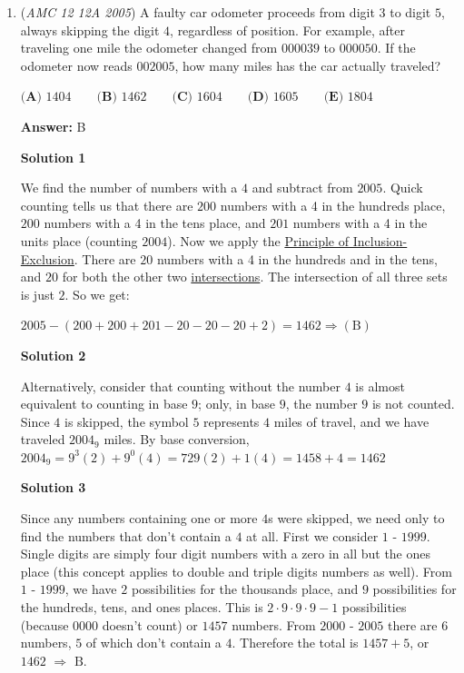 \begin{enumerate}
 $|S_2 \cup S_3 \cup S_5| = |S_2| + |S_3| + |S_5| - |S_2 \cap S_3| - |S_3 \cap S_5| - |S_2 \cap S_5| + |S_2 \cap S_3 \cap S_5|$
$= 500 + 333 + 200 - 166 - 66 - 100 + 33 = 734$Substituting, we find that our answer is $1000 - 165 - 1 - 734 = 100 \Longrightarrow \mathrm{(A)}$.

 


	\item (\textit{AMC 12 12A 2005}) A faulty car odometer proceeds from digit $3$ to digit $5$, always skipping the digit $4$, regardless of position. For example, after traveling one mile the odometer changed from $000039$ to $000050$. If the odometer now reads $002005$, how many miles has the car actually traveled?


 $\textbf{(A) } 1404 \qquad \textbf{(B) } 1462 \qquad \textbf{(C) } 1604 \qquad \textbf{(D) } 1605 \qquad \textbf{(E) } 1804$

 \textbf{Answer: }B



\textbf{Solution 1}

We find the number of numbers with a $4$ and subtract from $2005$. Quick counting tells us that there are $200$ numbers with a 4 in the hundreds place, $200$ numbers with a 4 in the tens place, and $201$ numbers with a 4 in the units place (counting $2004$). Now we apply the \href{https://artofproblemsolving.com/wiki/index.php?title=Principle\_of\_Inclusion-Exclusion}{Principle of Inclusion-Exclusion}. There are $20$ numbers with a 4 in the hundreds and in the tens, and $20$ for both the other two \href{https://artofproblemsolving.com/wiki/index.php?title=Intersection}{intersections}. The intersection of all three sets is just $2$. So we get:

 $2005-(200+200+201-20-20-20+2) = 1462 \Longrightarrow \mathrm{(B)}$



\textbf{Solution 2}

Alternatively, consider that counting without the number $4$ is almost equivalent to counting in base $9$; only, in base $9$, the number $9$ is not counted. Since $4$ is skipped, the symbol $5$ represents $4$ miles of travel, and we have traveled $2004_9$ miles. By    base conversion, $2004_9=9^3(2)+9^0(4)=729(2)+1(4)=1458+4=\boxed{1462}$




\textbf{Solution 3}

Since any numbers containing one or more $4$s were skipped, we need only to find the numbers that don't contain a $4$ at all. First we consider $1$ - $1999$. Single digits are simply four digit numbers with a zero in all but the ones place (this concept applies to double and triple digits numbers as well). From $1$ - $1999$, we have $2$ possibilities for the thousands place, and $9$ possibilities for the hundreds, tens, and ones places. This is $2 \cdot 9 \cdot 9 \cdot 9-1$ possibilities (because $0000$ doesn't count) or $1457$ numbers. From $2000$ - $2005$ there are $6$ numbers, $5$ of which don't contain a $4$. Therefore the total is $1457 + 5$, or $1462$ $\Rightarrow$ $\boxed{\text{B}}$.


\end{enumerate}
